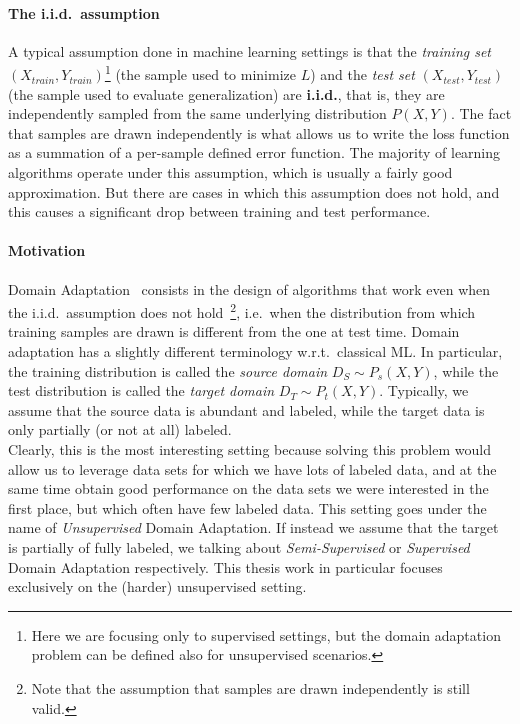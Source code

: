 \documentclass[../main.tex]{subfiles}
\begin{document}
    \paragraph{The i.i.d.\ assumption}
    A typical assumption done in machine learning settings is that the \textit{training set}
    $( X_{train}, Y_{train} )$\footnote{Here we are focusing only to supervised settings, but the domain adaptation problem
    can be defined also for unsupervised scenarios.} (the sample used to minimize $L$) and the \textit{test set} $( X_{test}, Y_{test} )$
    (the sample used to evaluate generalization) are \textbf{i.i.d.}, that is, they are independently sampled from the same
    underlying distribution $P(X, Y)$. The fact that samples are drawn independently is what allows us to write the loss function
    as a summation of a per-sample defined error function.
    The majority of learning algorithms operate under this assumption, which is usually a fairly good
    approximation. But there are cases in which this assumption does not hold, and this causes a significant drop between
    training and test performance.

    \paragraph{Motivation}
    Domain Adaptation~\cite{domain-adaptation-review} consists in the design of algorithms that work even when the i.i.d.\
    assumption does not hold~\footnote{Note that the assumption that samples are drawn independently is still valid.},
    i.e.\ when the distribution from which training samples are drawn is different from the one at test time.
    Domain adaptation has a slightly different terminology w.r.t.\ classical ML\@. In particular, the training distribution
    is called the \textit{source domain} $D_{S} \sim P_{s}(X, Y)$, while the test distribution is called the
    \textit{target domain} $D_{T} \sim P_{t}(X, Y)$.
    Typically, we assume that the source data is abundant and labeled, while the target data is only partially (or not at all) labeled. \\
    Clearly, this is the most interesting setting because solving this problem would allow us to leverage data sets for
    which we have lots of labeled data, and at the same time obtain good performance on the data sets we were interested in the first
    place, but which often have few labeled data. This setting goes under the name of \textit{Unsupervised} Domain Adaptation. If instead
    we assume that the target is partially of fully labeled, we talking about \textit{Semi-Supervised} or \textit{Supervised} Domain
    Adaptation respectively. This thesis work in particular focuses exclusively on the (harder) unsupervised setting.
\end{document}
